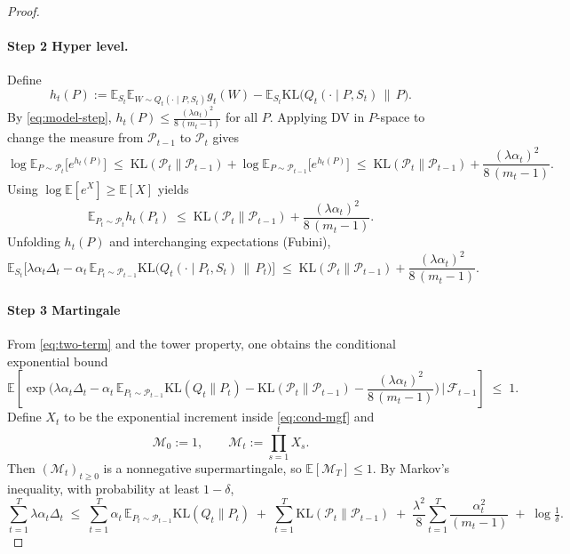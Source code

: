\documentclass{article}
\theoremstyle{plain}
\theoremstyle{definition}
\theoremstyle{remark}
\begin{document}
\begin{proof}
\paragraph{Step 2 Hyper level.} 
Define
\[
h_t(P):=\mathbb E_{S_t}\mathbb E_{W\sim Q_t(\cdot\mid P,S_t)} g_t(W)
-\mathbb E_{S_t}\mathrm{KL}\!\big(Q_t(\cdot\mid P,S_t)\,\|\,P\big).
\]
By \eqref{eq:model-step}, $h_t(P)\le \frac{(\lambda\alpha_t)^2}{8\,(m_t-1)}$ for all $P$.
Applying DV in $P$-space to change the measure from $\mathcal P_{t-1}$ to $\mathcal P_t$ gives
\begin{equation}
\label{eq:dv-p}
\log\mathbb E_{P\sim\mathcal P_t}\!\big[e^{h_t(P)}\big]
\;\le\; \mathrm{KL}(\mathcal P_t\|\mathcal P_{t-1})
+\log\mathbb E_{P\sim\mathcal P_{t-1}}\!\big[e^{h_t(P)}\big]
\;\le\; \mathrm{KL}(\mathcal P_t\|\mathcal P_{t-1})
+\frac{(\lambda\alpha_t)^2}{8\,(m_t-1)}.
\end{equation}
Using $\log\mathbb E[e^X]\ge \mathbb E[X]$ yields
\begin{equation}
\label{eq:p-expect}
\mathbb E_{P_t\sim\mathcal P_t} h_t(P_t)
\;\le\; \mathrm{KL}(\mathcal P_t\|\mathcal P_{t-1})
+\frac{(\lambda\alpha_t)^2}{8\,(m_t-1)}.
\end{equation}
Unfolding $h_t(P)$ and interchanging expectations (Fubini),
\begin{equation}
\label{eq:two-term}
\mathbb E_{S_t}\Big[
\lambda\alpha_t\Delta_t
-\alpha_t\,\mathbb E_{P_t\sim\mathcal P_{t-1}}\mathrm{KL}\!\big(Q_t(\cdot\mid P_t,S_t)\,\|\,P_t\big)
\Big]
\;\le\;
\mathrm{KL}(\mathcal P_t\|\mathcal P_{t-1})
+\frac{(\lambda\alpha_t)^2}{8\,(m_t-1)}.
\end{equation}

\paragraph{Step 3 Martingale}
From \eqref{eq:two-term} and the tower property, one obtains the conditional exponential bound
\begin{equation}
\label{eq:cond-mgf}
\mathbb E\!\left[
\exp\!\Big(
\lambda\alpha_t\Delta_t
-\alpha_t\,\mathbb E_{P_t\sim\mathcal P_{t-1}}\mathrm{KL}(Q_t\|P_t)
-\mathrm{KL}(\mathcal P_t\|\mathcal P_{t-1})
-\frac{(\lambda\alpha_t)^2}{8\,(m_t-1)}
\Big)\,\Big|\,\mathcal F_{t-1}\right]\;\le\;1.
\end{equation}
Define $X_t$ to be the exponential increment inside \eqref{eq:cond-mgf} and
\[
\mathcal{M}_0:=1,\qquad
\mathcal{M}_t:=\prod_{s=1}^t X_s.
\]
Then $(\mathcal{M}_t)_{t\ge0}$ is a nonnegative supermartingale, so
$\mathbb E[\mathcal{M}_T]\le 1$.
By Markov's inequality, with probability at least $1-\delta$,
\begin{equation}
\label{eq:hpp}
\sum_{t=1}^T \lambda\alpha_t\Delta_t
\;\le\;
\sum_{t=1}^T \alpha_t\,\mathbb E_{P_t\sim\mathcal P_{t-1}}\mathrm{KL}(Q_t\|P_t)
\;+\; \sum_{t=1}^T \mathrm{KL}(\mathcal P_t\|\mathcal P_{t-1})
\;+\; \frac{\lambda^2}{8}\sum_{t=1}^T \frac{\alpha_t^2}{(m_t-1)}
\;+\; \log\tfrac1\delta.
\end{equation}


\end{proof}
\end{document}
